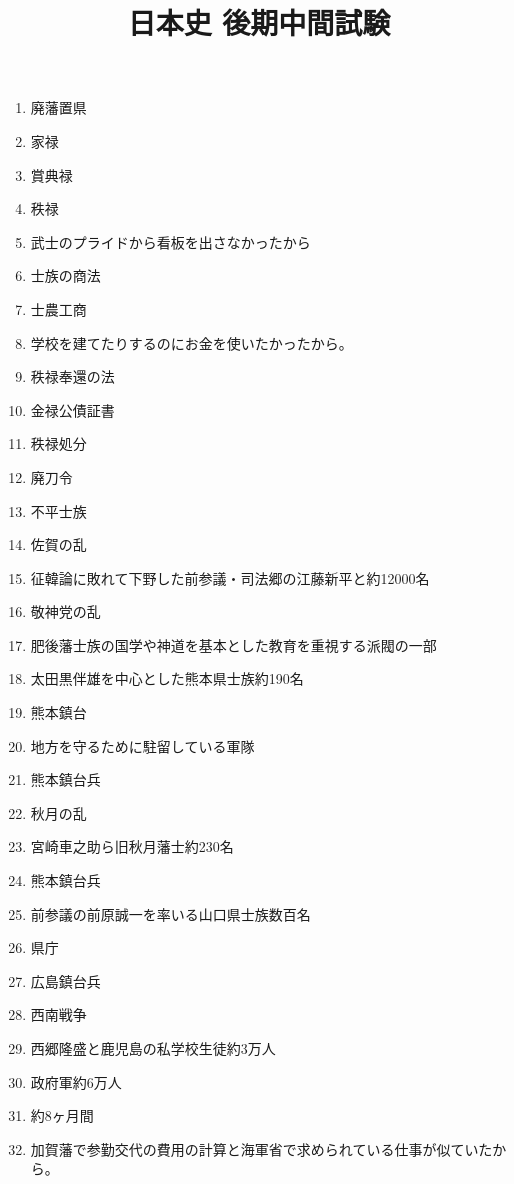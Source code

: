 \documentclass[]{jsarticle}
\begin{document}
\title{日本史 後期中間試験}
\author{}
\date{}

\maketitle

\renewcommand{\labelenumi}{(\arabic{enumi})}

\begin{enumerate}
	\item 廃藩置県
	\item 家禄
	\item 賞典禄
	\item 秩禄
	\item 武士のプライドから看板を出さなかったから
	      \\
	\item 士族の商法
	\item 士農工商
	\item 学校を建てたりするのにお金を使いたかったから。
	\item 秩禄奉還の法
	\item 金禄公債証書
	\item 秩禄処分
	\item 廃刀令
	\item 不平士族
	\item 佐賀の乱
	\item 征韓論に敗れて下野した前参議・司法郷の江藤新平と約12000名
	\item 敬神党の乱
	\item 肥後藩士族の国学や神道を基本とした教育を重視する派閥の一部
	\item 太田黒伴雄を中心とした熊本県士族約190名
	\item 熊本鎮台
	\item 地方を守るために駐留している軍隊
	\item 熊本鎮台兵
	\item 秋月の乱
	\item 宮崎車之助ら旧秋月藩士約230名
	\item 熊本鎮台兵
	\item 前参議の前原誠一を率いる山口県士族数百名
	\item 県庁
	\item 広島鎮台兵
	\item 西南戦争
	\item 西郷隆盛と鹿児島の私学校生徒約3万人
	\item 政府軍約6万人
	\item 約8ヶ月間
	\item 加賀藩で参勤交代の費用の計算と海軍省で求められている仕事が似ていたから。

\end{enumerate}
\end{document}
